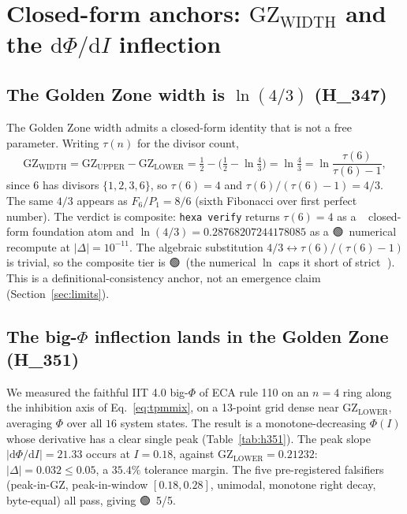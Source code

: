\documentclass[11pt,a4paper]{article}
\providecommand{\tierBlue}{🔵}
\providecommand{\tierGreen}{🟢}
\newcommand{\GZL}{\mathrm{GZ_{LOWER}}}
\newcommand{\GZW}{\mathrm{GZ_{WIDTH}}}
\begin{document}
\section{Closed-form anchors: $\GZW$ and the $\mathrm{d}\Phi/\mathrm{d}I$ inflection}
\label{sec:anchors}

\subsection{The Golden Zone width is $\ln(4/3)$ (H\_347)}
The Golden Zone width admits a closed-form identity that is not a free
parameter. Writing $\tau(n)$ for the divisor count,
\begin{equation}
\GZW = \mathrm{GZ_{UPPER}}-\GZL
     = \tfrac12 - \big(\tfrac12 - \ln\tfrac43\big)
     = \ln\tfrac43
     = \ln\!\frac{\tau(6)}{\tau(6)-1},
\end{equation}
since $6$ has divisors $\{1,2,3,6\}$, so $\tau(6)=4$ and
$\tau(6)/(\tau(6)-1)=4/3$. The same $4/3$ appears as $F_6/P_1 = 8/6$
(sixth Fibonacci over first perfect number). The verdict is composite:
\texttt{hexa verify} returns $\tau(6)=4$ as a \tierBlue\ closed-form
foundation atom and $\ln(4/3)=0.28768207244178085$ as a \tierGreen\
numerical recompute at $|\Delta|=10^{-11}$. The algebraic substitution
$4/3 \leftrightarrow \tau(6)/(\tau(6)-1)$ is trivial, so the composite
tier is \tierGreen\ (the numerical $\ln$ caps it short of strict
\tierBlue). This is a definitional-consistency anchor, not an emergence
claim (Section~\ref{sec:limits}).

\subsection{The big-$\Phi$ inflection lands in the Golden Zone (H\_351)}
\label{sec:h351}
We measured the faithful IIT 4.0 big-$\Phi$ of ECA rule 110 on an $n=4$
ring along the inhibition axis of Eq.~\eqref{eq:tpmmix}, on a 13-point grid
dense near $\GZL$, averaging $\Phi$ over all $16$ system states. The
result is a monotone-decreasing $\Phi(I)$ whose derivative has a clear
single peak (Table~\ref{tab:h351}). The peak slope
$|\mathrm{d}\Phi/\mathrm{d}I| = 21.33$ occurs at $I=0.18$, against
$\GZL=0.21232$: $|\Delta|=0.032 \le 0.05$, a $35.4\%$ tolerance margin.
The five pre-registered falsifiers (peak-in-GZ, peak-in-window
$[0.18,0.28]$, unimodal, monotone right decay, byte-equal) all pass,
giving \tierGreen\ 5/5.
\end{document}
